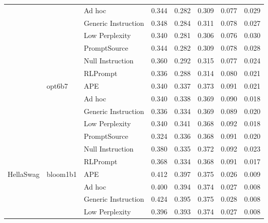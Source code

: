 \begin{supertabular}{lllrrrrr}
              &        & Ad hoc &            0.344 &           0.282 &          0.309 &        0.077 &    0.029 \\
              &        & Generic Instruction &            0.348 &           0.284 &          0.311 &        0.078 &    0.027 \\
              &        & Low Perplexity &            0.340 &           0.281 &          0.306 &        0.076 &    0.030 \\
              &        & PromptSource &            0.344 &           0.282 &          0.309 &        0.078 &    0.028 \\
              &        & Null Instruction &            0.360 &           0.292 &          0.315 &        0.077 &    0.024 \\
              &        & RLPrompt &            0.336 &           0.288 &          0.314 &        0.080 &    0.021 \\
              & opt6b7 & APE &            0.340 &           0.337 &          0.373 &        0.091 &    0.021 \\
              &        & Ad hoc &            0.340 &           0.338 &          0.369 &        0.090 &    0.018 \\
              &        & Generic Instruction &            0.336 &           0.334 &          0.369 &        0.089 &    0.020 \\
              &        & Low Perplexity &            0.340 &           0.341 &          0.368 &        0.092 &    0.018 \\
              &        & PromptSource &            0.324 &           0.336 &          0.368 &        0.091 &    0.020 \\
              &        & Null Instruction &            0.380 &           0.335 &          0.372 &        0.092 &    0.023 \\
              &        & RLPrompt &            0.368 &           0.334 &          0.368 &        0.091 &    0.017 \\
HellaSwag & bloom1b1 & APE &            0.412 &           0.397 &          0.375 &        0.026 &    0.009 \\
              &        & Ad hoc &            0.400 &           0.394 &          0.374 &        0.027 &    0.008 \\
              &        & Generic Instruction &            0.424 &           0.395 &          0.375 &        0.028 &    0.008 \\
              &        & Low Perplexity &            0.396 &           0.393 &          0.374 &        0.027 &    0.008 \\

\end{supertabular}
